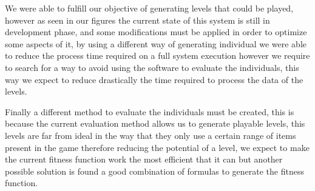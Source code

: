 \documentclass[conference]{IEEEtran}
\begin{document}
    We were able to fulfill our objective of generating levels that could be played, 
    however as seen in our figures the current state of this system is still in development 
    phase, and some modifications must be applied in order to optimize some aspects of it, 
    by using a different way of generating individual we were able to reduce the process 
    time required on a full system execution however we require to search for a way to 
    avoid using the software to evaluate the individuals, this way we expect to reduce 
    drastically the time required to process the data of the levels. 
    
    Finally a different method to evaluate the individuals must be created, this is
    because the current evaluation method allows us to generate playable levels,
    this levels are far from ideal in the way that they only use a certain range of
    items present in the game therefore reducing the potential of a level, we expect
    to make the current fitness function work the most efficient that it can but
    another possible solution is found a good combination of formulas to generate
    the fitness function.



\end{document}

